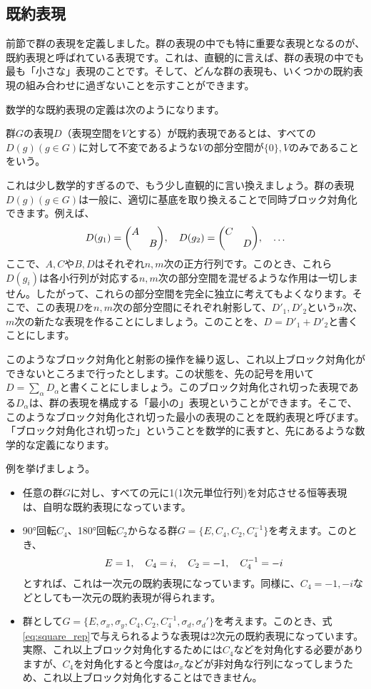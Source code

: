 \documentclass[uplatex,dvipdfmx,a4j]{jsarticle}
\begin{document}
\subsection{既約表現}
前節で群の表現を定義しました。群の表現の中でも特に重要な表現となるのが、既約表現と呼ばれている表現です。これは、直観的に言えば、群の表現の中でも最も「小さな」表現のことです。そして、どんな群の表現も、いくつかの既約表現の組み合わせに過ぎないことを示すことができます。

数学的な既約表現の定義は次のようになります。
\begin{tcolorbox}[title=定義：群の既約表現]
	群$G$の表現$D$（表現空間を$V$とする）が既約表現であるとは、すべての$D(g) (g\in G)$に対して不変であるような$V$の部分空間が$\{0\},V$のみであることをいう。 
\end{tcolorbox}
これは少し数学的すぎるので、もう少し直観的に言い換えましょう。群の表現$D(g) (g \in G)$は一般に、適切に基底を取り換えることで同時ブロック対角化できます。例えば、
\begin{align}
	D(g_1) = \mqty(\dmat{A, B}) \qc D(g_2) = \mqty(\dmat{C, D})\qc \dots
\end{align}
ここで、$A,C$や$B,D$はそれぞれ$n, m$次の正方行列です。このとき、これら$D(g_i)$は各小行列が対応する$n,m$次の部分空間を混ぜるような作用は一切しません。したがって、これらの部分空間を完全に独立に考えてもよくなります。そこで、この表現$D$を$n,m$次の部分空間にそれぞれ射影して、$D'_1, D'_2$という$n$次、$m$次の新たな表現を作ることにしましょう。このことを、$D = D'_1 + D'_2$と書くことにします。

このようなブロック対角化と射影の操作を繰り返し、これ以上ブロック対角化ができないところまで行ったとします。この状態を、先の記号を用いて$D = \sum_\alpha D_\alpha$と書くことにしましょう。このブロック対角化され切った表現である$D_\alpha$は、群の表現を構成する「最小の」表現ということができます。そこで、このようなブロック対角化され切った最小の表現のことを既約表現と呼びます。「ブロック対角化され切った」ということを数学的に表すと、先にあるような数学的な定義になります。

例を挙げましょう。
\begin{itemize}
	\item 任意の群$G$に対し、すべての元に1(1次元単位行列)を対応させる恒等表現は、自明な既約表現になっています。
	\item 90°回転$C_4$、180°回転$C_2$からなる群$G = \{E, C_4, C_2, C_4^{-1}\}$を考えます。このとき、\begin{align}
		E = 1 \qc C_4 = i \qc C_2 = -1 \qc C_4^{-1} = -i
	\end{align}
	とすれば、これは一次元の既約表現になっています。同様に、$C_4 = -1, -i$などとしても一次元の既約表現が得られます。
	\item 群として$G = \{ E, \sigma_x, \sigma_y, C_4, C_2, C_4^{-1}, \sigma_d, \sigma_d'\}$を考えます。このとき、式\eqref{eq:square_rep}で与えられるような表現は2次元の既約表現になっています。実際、これ以上ブロック対角化するためには$C_4$などを対角化する必要がありますが、$C_4$を対角化すると今度は$\sigma_x$などが非対角な行列になってしまうため、これ以上ブロック対角化することはできません。
\end{itemize}
\end{document}
